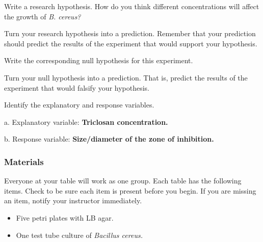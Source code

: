 \documentclass[12pt]{exam}
\begin{document}
\begin{questions}

\question \label{ques:hypothesis}
Write a research hypothesis. How do you think different concentrations will affect the growth of \textit{B. cereus?}

\newpage

\question
Turn your research hypothesis into a prediction. Remember that your prediction should predict the results of the experiment that would support your hypothesis. 

\vspace*{3\baselineskip}

\question \label{ques:hypothesis}
Write the corresponding null hypothesis for this experiment. 

\vspace*{3\baselineskip}

\question
Turn your null hypothesis into a prediction. That is, predict the results of the experiment that would falsify your hypothesis. 

\vspace*{3\baselineskip}

\question
Identify the explanatory and response variables. 

a. Explanatory variable: \ifprintanswers \textbf{Triclosan concentration.} \fi
	
	\vspace*{\baselineskip}
	
b. Response variable: \ifprintanswers \textbf{Size/diameter of the zone of inhibition.} \fi
 

\vspace*{0.5\baselineskip}

\subsubsection*{Materials}

Everyone at your table will work as one group. Each table has the following items. Check to be sure each item is present before you begin. If you are missing an item, notify your instructor immediately.

\begin{itemize}

	\item Five petri plates with LB agar.
	
	\item One test tube culture of \textit{Bacillus cereus.}
	

\end{itemize}
\end{questions}
\end{document}
